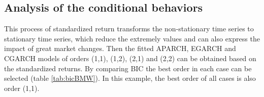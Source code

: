 

\subsection{Analysis of the conditional behaviors}

This process of standardized return transforms the non-stationary time series to stationary time series, which reduce the extremely values and can also express the impact of great market changes. Then the fitted APARCH, EGARCH and CGARCH models of orders (1,1), (1,2), (2,1) and (2,2) can be obtained based on the standardized returns. By comparing BIC the best order in each case can be selected (table \ref{tab:bicBMW}). In this example, the best order of all cases is also order (1,1).








